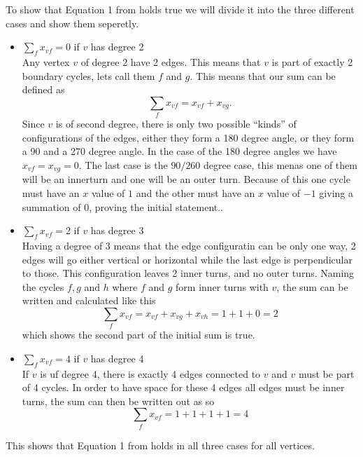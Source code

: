 To show that Equation 1 from \cite{assignment1} holds true we will divide it
into the three different cases and show them seperetly.
\begin{itemize}
\item $\sum_f x_{vf} = 0$ if $v$ has degree 2 \\
  Any vertex $v$ of degree 2 have 2 edges. This means that $v$ is part of
  exactly 2 boundary cycles, lets call them $f$ and $g$. This means that our sum
  can be defined as
  \[
    \sum_f x_{vf} = x_{vf} + x_{vg}.
  \]
  Since $v$ is of second degree, there is only two possible ``kinds'' of
  configurations of the edges, either they form a 180 degree angle, or they form
  a 90 and a 270 degree angle.  In the case of the 180 degree angles we have
  $x_{vf} = x_{vg} = 0$. The last case is the $90/260$ degree case, this menas
  one of them will be an innerturn and one will be an outer turn. Because of
  this one cycle must have an $x$ value of $1$ and the other must have an $x$
  value of $-1$ giving a summation of 0, proving the initial statement..
\item $\sum_f x_{vf} = 2$ if $v$ has degree 3 \\
  Having a degree of 3 means that the edge configuratin can be only one way, 2
  edges will go either vertical or horizontal while the last edge is
  perpendicular to those. This configuration leaves 2 inner turns, and no outer
  turns. Naming the cycles $f, g$ and $h$ where $f$ and $g$ form inner turns
  with $v$, the sum can be written and calculated like this
  \[
    \sum_f x_{vf} = x_{vf} + x_{vg} + x_{vh} = 1 + 1 + 0 = 2
  \]
  which shows the second part of the initial sum is true.

\item $\sum_f x_{vf} = 4$ if $v$ has degree 4 \\
  If $v$ is uf degree 4, there is exactly 4 edges connected to $v$ and $v$ must
  be part of 4 cycles. In order to have space for these 4 edges all edges must
  be inner turns, the sum can then be written out as so
  \[
    \sum_f x_{vf} = 1 + 1 + 1 + 1 = 4
  \]
\end{itemize}
%
This shows that Equation 1 from \cite{assignment1} holds in all three cases for
all vertices.
%
